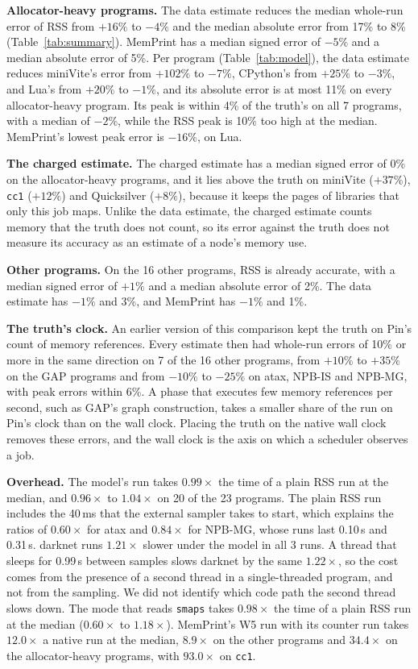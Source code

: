 \documentclass[11pt]{article}
\newcommand{\memprint}{MemPrint}
\newcommand{\tabref}[1]{Table~\ref{#1}}
\begin{document}
\textbf{Allocator-heavy programs.} The data estimate reduces the median whole-run error of RSS from $+16\%$ to $-4\%$
and the median absolute error from 17\% to 8\% (\tabref{tab:summary}). \memprint{} has a median signed error of
$-5\%$ and a median absolute error of 5\%. Per program (\tabref{tab:model}), the data estimate reduces miniVite's
error from $+102\%$ to $-7\%$, CPython's from $+25\%$ to $-3\%$, and Lua's from $+20\%$ to $-1\%$, and its absolute
error is at most 11\% on every allocator-heavy program. Its peak is within 4\% of the truth's on all 7 programs, with a
median of $-2\%$, while the RSS peak is 10\% too high at the median. \memprint{}'s lowest peak error is $-16\%$, on
Lua.

\textbf{The charged estimate.} The charged estimate has a median signed error of 0\% on the allocator-heavy programs,
and it lies above the truth on miniVite ($+37\%$), \texttt{cc1} ($+12\%$) and Quicksilver ($+8\%$), because it keeps
the pages of libraries that only this job maps. Unlike the data estimate, the charged estimate counts memory that the
truth does not count, so its error against the truth does not measure its accuracy as an estimate of a node's memory
use.

\textbf{Other programs.} On the 16 other programs, RSS is already accurate, with a median signed error of $+1\%$ and a
median absolute error of 2\%. The data estimate has $-1\%$ and 3\%, and \memprint{} has $-1\%$ and 1\%.

\textbf{The truth's clock.} An earlier version of this comparison kept the truth on Pin's count of memory references.
Every estimate then had whole-run errors of 10\% or more in the same direction on 7 of the 16 other programs, from
$+10\%$ to $+35\%$ on the GAP programs and from $-10\%$ to $-25\%$ on atax, NPB-IS and NPB-MG, with peak errors within
6\%. A phase that executes few memory references per second, such as GAP's graph construction, takes a smaller share
of the run on Pin's clock than on the wall clock. Placing the truth on the native wall clock removes these errors, and
the wall clock is the axis on which a scheduler observes a job.

\textbf{Overhead.} The model's run takes $0.99\times$ the time of a plain RSS run at the median, and $0.96\times$ to
$1.04\times$ on 20 of the 23 programs. The plain RSS run includes the 40\,ms that the external sampler takes to start,
which explains the ratios of $0.60\times$ for atax and $0.84\times$ for NPB-MG, whose runs last 0.10\,s and 0.31\,s.
darknet runs $1.21\times$ slower under the model in all 3 runs. A thread that sleeps for 0.99\,s between samples slows
darknet by the same $1.22\times$, so the cost comes from the presence of a second thread in a single-threaded program,
and not from the sampling. We did not identify which code path the second thread slows down. The mode that reads
\texttt{smaps} takes $0.98\times$ the time of a plain RSS run at the median ($0.60\times$ to $1.18\times$).
\memprint{}'s W5 run with its counter run takes $12.0\times$ a native run at the median, $8.9\times$ on the other
programs and $34.4\times$ on the allocator-heavy programs, with $93.0\times$ on \texttt{cc1}.
\end{document}
